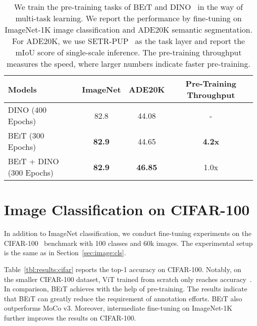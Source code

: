 \documentclass{article}
\newcommand\our{\textsc{BEiT}}
\begin{document}
\begin{table}[h]
\centering
\begin{tabular}{lccc}
\toprule
\bf 
Models & \bf ImageNet & \bf ADE20K & \bf Pre-Training Throughput \\ \midrule
DINO (400 Epochs)           & 82.8 & 44.08 & - \\
\our{} (300 Epochs)             & \textbf{82.9}    &  44.65 & \textbf{4.2x} \\
\our{} + DINO (300 Epochs) & \textbf{82.9} & \textbf{46.85} & 1.0x \\
\bottomrule
\end{tabular}
\caption{We train the pre-training tasks of \our{} and DINO~\citep{dino} in the way of multi-task learning. We report the performance by fine-tuning on ImageNet-1K image classification and ADE20K semantic segmentation. For ADE20K, we use SETR-PUP~\citep{setr} as the task layer and report the mIoU score of single-scale inference.
The pre-training throughput measures the speed, where larger numbers indicate faster pre-training.}
\label{tbl:multitask:dino}
\end{table}


\section{Image Classification on CIFAR-100}
\label{app:cifar100}

In addition to ImageNet classification, we conduct fine-tuning experiments on the CIFAR-100~\citep{cifar100} benchmark with 100 classes and 60k images. The experimental setup is the same as in Section~\ref{sec:image:cls}.

Table~\ref{tbl:results:cifar} reports the top-1 accuracy on CIFAR-100.
Notably, on the smaller CIFAR-100 dataset, ViT trained from scratch only reaches  accuracy~\citep{mocov3}. In comparison, \our{} achieves  with the help of pre-training.
The results indicate that \our{} can greatly reduce the requirement of annotation efforts.
\our{} also outperforms MoCo v3.
Moreover, intermediate fine-tuning on ImageNet-1K further improves the results on CIFAR-100.
\end{document}
